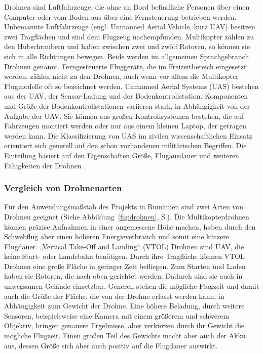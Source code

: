 Drohnen sind Luftfahrzeuge, die ohne an Bord befindliche Personen über einen Computer oder vom Boden aus über eine Fernsteuerung betrieben werden. Unbemannte Luftfahrzeuge (engl. Unmanned Aerial Vehicle, kurz UAV) besitzen zwei Tragflächen und sind dem Flugzeug nachempfunden. Multikopter zählen zu den Hubschraubern und haben zwischen zwei und zwölf Rotoren, so können sie sich in alle Richtungen bewegen. Beide werden im allgemeinen Sprachgebrauch Drohnen genannt. Ferngesteuerte Fluggeräte, die im Freizeitbereich eingesetzt werden, zählen nicht zu den Drohnen, auch wenn vor allem die Multikopter Flugmodelle oft so bezeichnet werden. Unmanned Aerial Systems (UAS) bestehen aus der UAV, der Sensor-Ladung und der Bodenkontrollstation. Komponenten und Größe der Bodenkontrollstationen variieren stark, in Abhängigkeit von der Aufgabe der UAV. Sie können aus großen Kontrollsystemen bestehen, die auf Fahrzeugen montiert werden oder nur aus einem kleinen Laptop, der getragen werden kann. Die Klassifizierung von UAS im zivilen wissenschaftlichen Einsatz orientiert sich generell auf den schon vorhandenen militärischen Begriffen. Die Einteilung basiert auf den Eigenschaften Größe, Flugausdauer und weiteren Fähigkeiten der Drohnen \citep[vgl.][]{Watts2012}.

\subsubsection{Vergleich von Drohnenarten}

Für den Anwendungsmaßstab des Projekts in Rumänien sind zwei Arten von Drohnen geeignet (Siehe Abbildung~\ref{fig:drohnen}, S.\pageref{fig:drohnen}). Die Multikopterdrohnen können präzise Aufnahmen in einer angemessene Höhe machen, haben durch den Schwebflug aber einen höheren Energieverbrauch und somit eine kürzere Flugdauer. „Vertical Take-Off and Landing“ (VTOL) Drohnen sind UAV, die keine Start- oder Landebahn benötigen. Durch ihre Tragfläche können VTOL Drohnen eine große Fläche in geringer Zeit befliegen. Zum Starten und Laden haben sie Rotoren, die nach oben gerichtet werden. Dadurch sind sie auch in unwegsamen Gelände einsetzbar.
Generell stehen die mögliche Flugzeit und damit auch die Größe der Fläche, die von der Drohne erfasst werden kann, in Abhängigkeit zum Gewicht der Drohne. Eine höhere Beladung, durch weitere Sensoren, beispielsweise eine Kamera mit einem größerem und schwerem Objektiv, bringen genauere Ergebnisse, aber verkürzen durch ihr Gewicht die mögliche Flugzeit. Einen großen Teil des Gewichts macht aber auch der Akku aus, dessen Größe sich aber auch positiv auf die Flugdauer auswirkt.


